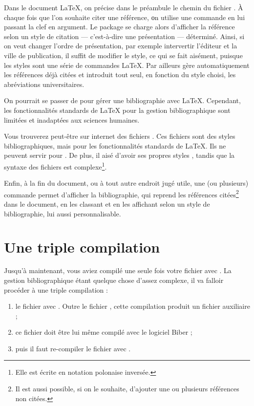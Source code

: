 Dans le document \LaTeX{}, on précise dans le préambule le chemin du fichier . À chaque fois que l'on souhaite citer une référence, οn utilise une commande en lui passant la clef en argument. Le package  se charge alors d'afficher la référence selon un style de citation --- c’est-à-dire une présentation --- déterminé. Ainsi, si on veut changer l'ordre de présentation, par exemple intervertir l'éditeur et la ville de publication, il suffit de modifier le style, ce qui se fait aisément, puisque les styles sont une série de commandes \LaTeX{}. Par ailleurs  gère automatiquement les références déjà citées et introduit tout seul, en fonction du style choisi, les abréviations universitaires. 

\begin{plusloins}
On pourrait se passer de   pour gérer une bibliographie avec \LaTeX{}. Cependant, les fonctionnalités standards de \LaTeX{} pour la gestion bibliographique sont limitées et inadaptées aux sciences humaines. 

Vous trouverez peut-être sur internet des fichiers . Ces fichiers sont des styles bibliographiques, mais pour les fonctionnalités standards de \LaTeX{}. Ils ne peuvent servir pour . De plus, il aisé d'avoir ses propres styles , tandis que la syntaxe des fichiers  est complexe\footnote{Elle est écrite en notation polonaise inversée.}.
\end{plusloins}

Enfin, à la fin du document, ou à tout autre endroit jugé utile, une (ou plusieurs) commande permet d'afficher la bibliographie, qui reprend les références citées\footnote{Il est aussi possible, si on le souhaite, d'ajouter une ou plusieurs références non citées.} dans le document, en les classant et en les affichant selon un style de bibliographie, lui aussi personnalisable.

\section{Une triple compilation}\label{3compil}

Jusqu'à maintenant, vous aviez compilé une seule fois votre fichier  avec \XeLaTeX. La gestion bibliographique étant quelque chose d'assez complexe, il va falloir procéder à une triple compilation :
\begin{enumerate}
\item le fichier  avec \XeLaTeX. Outre le fichier , cette compilation produit un fichier auxiliaire  ;
\item ce fichier doit être lui même compilé avec le logiciel Biber ;
\item puis il faut re-compiler le fichier  avec \XeLaTeX.
\end{enumerate}


